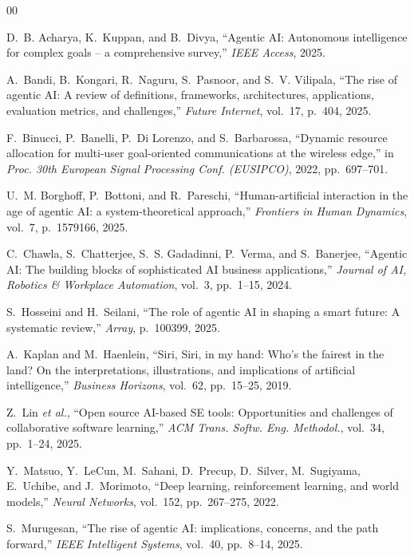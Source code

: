 \documentclass[conference]{IEEEtran}
\begin{document}
\begin{thebibliography}{00}

 D.~B. Acharya, K.~Kuppan, and B.~Divya, ``Agentic AI: Autonomous intelligence for complex goals -- a comprehensive survey,'' \emph{IEEE Access}, 2025.

 A.~Bandi, B.~Kongari, R.~Naguru, S.~Pasnoor, and S.~V. Vilipala, ``The rise of agentic AI: A review of definitions, frameworks, architectures, applications, evaluation metrics, and challenges,'' \emph{Future Internet}, vol.~17, p.~404, 2025.

 F.~Binucci, P.~Banelli, P.~Di Lorenzo, and S.~Barbarossa, ``Dynamic resource allocation for multi-user goal-oriented communications at the wireless edge,'' in \emph{Proc. 30th European Signal Processing Conf. (EUSIPCO)}, 2022, pp.~697--701.

 U.~M. Borghoff, P.~Bottoni, and R.~Pareschi, ``Human-artificial interaction in the age of agentic AI: a system-theoretical approach,'' \emph{Frontiers in Human Dynamics}, vol.~7, p.~1579166, 2025.

 C.~Chawla, S.~Chatterjee, S.~S. Gadadinni, P.~Verma, and S.~Banerjee, ``Agentic AI: The building blocks of sophisticated AI business applications,'' \emph{Journal of AI, Robotics \& Workplace Automation}, vol.~3, pp.~1--15, 2024.

 S.~Hosseini and H.~Seilani, ``The role of agentic AI in shaping a smart future: A systematic review,'' \emph{Array}, p.~100399, 2025.

 A.~Kaplan and M.~Haenlein, ``Siri, Siri, in my hand: Who's the fairest in the land? On the interpretations, illustrations, and implications of artificial intelligence,'' \emph{Business Horizons}, vol.~62, pp.~15--25, 2019.

 Z.~Lin \emph{et al.}, ``Open source AI-based SE tools: Opportunities and challenges of collaborative software learning,'' \emph{ACM Trans. Softw. Eng. Methodol.}, vol.~34, pp.~1--24, 2025.

 Y.~Matsuo, Y.~LeCun, M.~Sahani, D.~Precup, D.~Silver, M.~Sugiyama, E.~Uchibe, and J.~Morimoto, ``Deep learning, reinforcement learning, and world models,'' \emph{Neural Networks}, vol.~152, pp.~267--275, 2022.

 S.~Murugesan, ``The rise of agentic AI: implications, concerns, and the path forward,'' \emph{IEEE Intelligent Systems}, vol.~40, pp.~8--14, 2025.


\end{thebibliography}
\end{document}
